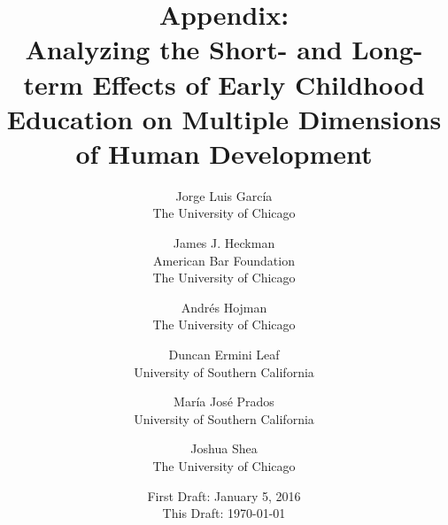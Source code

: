 




\title{\Large \textbf{Appendix: \\ Analyzing the Short- and Long-term Effects of Early Childhood Education on Multiple Dimensions of Human Development}}

\author{
Jorge Luis Garc\'{i}a\\
The University of Chicago \and
James J. Heckman \\
American Bar Foundation \\
The University of Chicago \and
Andr\'{e}s Hojman\\
The University of Chicago \and
Duncan Ermini Leaf \\ 
University of Southern California \and
Mar\'{i}a Jos\'{e} Prados \\
University of Southern California \and
Joshua Shea \\
The University of Chicago}
\date{First Draft: January 5, 2016\\ This Draft: \today}
\maketitle
\thispagestyle{empty}

\tableofcontents
\listoffigures
\listoftables
\pagebreak
\doublespacing

